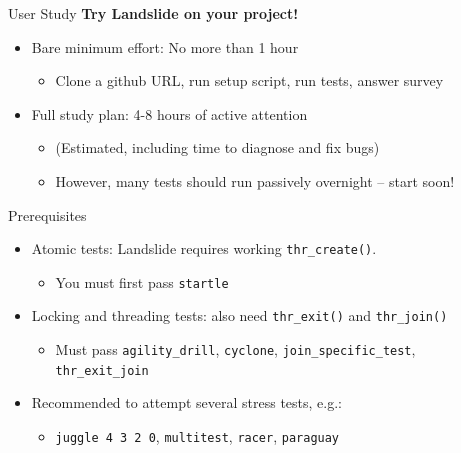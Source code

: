 \documentclass[xcolor=dvipsnames]{beamer}
\begin{document}
\begin{frame}{User Study}
	\textbf{Try Landslide on your project!}
	\begin{itemize}
		\item Bare minimum effort: No more than 1 hour
		\begin{itemize}
			\item Clone a github URL, run setup script, run tests, answer survey
		\end{itemize}
		\item Full study plan: 4-8 hours of active attention
		\begin{itemize}
			\item (Estimated, including time to diagnose and fix bugs)
			\item However, many tests should run passively overnight -- start soon!
		\end{itemize}
	\end{itemize}
	\pause
	\linegap

	Prerequisites
	\begin{itemize}
		\item Atomic tests: Landslide requires working {\tt thr\_create()}.
		\begin{itemize}
			\item You must first pass {\tt startle}
		\end{itemize}
		\item Locking and threading tests: also need {\tt thr\_exit()} and {\tt thr\_join()}
		\begin{itemize}
			\item Must pass {\tt agility\_drill}, {\tt cyclone}, {\tt join\_specific\_test}, {\tt thr\_exit\_join}
		\end{itemize}
		\item Recommended to attempt several stress tests, e.g.:
		\begin{itemize}
			\item {\tt juggle 4 3 2 0}, {\tt multitest}, {\tt racer}, {\tt paraguay}
		\end{itemize}

	\end{itemize}
\end{frame}
\end{document}
